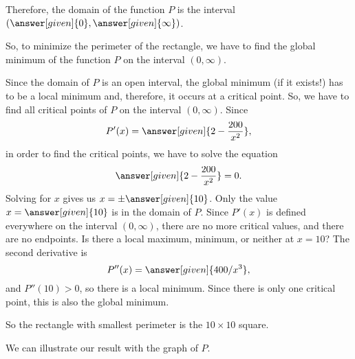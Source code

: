 \documentclass{ximera}
\begin{document}
\begin{example}
\begin{explanation}
     Therefore, the domain of  the function $P$ is  the interval
    $(\answer[given]{0},\answer[given]{\infty})$. 
      
    So, to minimize the perimeter of the rectangle, we have to find the global minimum of the function $P$ on the interval $(0,\infty)$.
    
   Since the domain of $P$ is an open interval, the global minimum (if it exists!) has to be a local minimum and, therefore, it occurs at a critical point.
   So, we have to find all critical points of $P$ on the interval $(0,\infty)$.
    Since
    \[
    P'(x) = \answer[given]{2-\frac{200}{x^2}},
    \]
   in order to find the critical points, we have to solve the equation
    \[
    \answer[given]{2-\frac{200}{x^2}} = 0.
    \]
  Solving for $x$ gives us $x=\pm \answer[given]{10}$. 
Only the value $x=\answer[given]{10}$ is in the domain of $P$.
 Since $P'(x)$ is defined everywhere on the interval
$(0,\infty)$, there are no more critical values, and there are no
endpoints.
 Is there a local maximum, minimum, or neither at $x=10$?
The second derivative is
\[
P''(x)=\answer[given]{400/x^3},
\]
and $P''(10)>0$, so there is a local minimum. Since there is only one
critical point, this is also the global minimum.

 So the rectangle with
smallest perimeter is the $10\times10$  square.

We can illustrate our result with the graph of $P$.
\begin{image}
\end{image}
\end{explanation}
\end{example}
\end{document}
